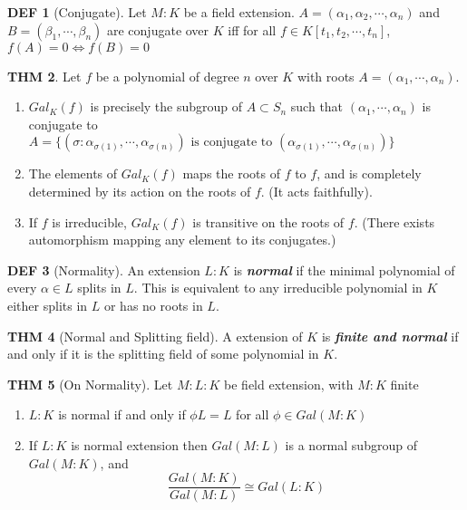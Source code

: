 \documentclass[twocolumn]{article}
\renewcommand{\emph}[1]{\textbf{\textit{#1}}}
\theoremstyle{definition}
\newtheorem{thm}{THM}
\newtheorem{defi}[thm]{DEF}
\theoremstyle{remark}
\begin{document}
\begin{defi}[Conjugate]
	Let $M:K$ be a field extension. $A = (\alpha_1, \alpha_2, \cdots, \alpha_n)$ and $B = (\beta_1, \cdots, \beta_n)$ are conjugate over $K$ iff for all $f \in K[t_1, t_2, \cdots, t_n]$, $f(A) = 0 \iff f(B) = 0$
\end{defi}

\begin{thm}
	Let $f$ be a polynomial of degree $n$ over $K$ with roots $A = (\alpha_1, \cdots, \alpha_n)$.
	\begin{enumerate} 
		\item $Gal_K(f)$ is precisely the subgroup of $A \subset S_n$ such that 
			$(\alpha_1, \cdots, \alpha_n)$ is conjugate to $A = \{(\sigma: \alpha_{\sigma(1)}, \cdots, \alpha_{\sigma(n)}) \text{ is conjugate to } (\alpha_{\sigma(1)}, \cdots, \alpha_{\sigma(n)})\}$
		\item The elements of $Gal_K(f)$ maps the roots of $f$ to $f$, and is completely determined by its action on the roots of $f$. (It acts faithfully).
		\item If $f$ is irreducible, $Gal_K(f)$ is transitive on the roots of $f$. (There exists automorphism mapping any element to its conjugates.)
	\end{enumerate}
\end{thm}

\begin{defi}[Normality]
	An extension $L:K$ is \emph{normal} if the minimal polynomial of every $\alpha \in L$ splits in $L$. 
	This is equivalent to any irreducible polynomial in $K$ either splits in $L$ or has no roots in $L$.
\end{defi}

\begin{thm}[Normal and Splitting field]
	A extension of $K$ is \emph{finite and normal} if and only if it is the splitting field of some polynomial in $K$.
\end{thm}

\begin{thm}[On Normality]
	Let $M:L:K$ be field extension, with $M:K$ finite
	\begin{enumerate}
		\item $L:K$ is normal if and only if $\phi L = L$ for all $\phi \in Gal(M:K)$
		\item If $L:K$ is normal extension then $Gal(M:L)$ is a normal subgroup of $Gal(M:K)$, and 
			$$
				\frac{Gal(M:K)}{Gal(M:L)} \cong Gal(L:K)
			$$
	\end{enumerate}
\end{thm}
\end{document}
